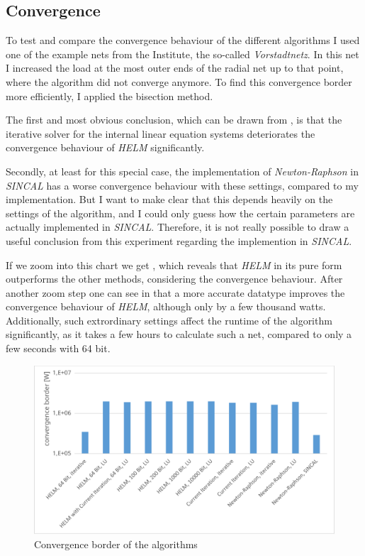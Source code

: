 \subsection{Convergence}

To test and compare the convergence behaviour of the different algorithms I used one of the example nets from the Institute, the so-called \emph{Vorstadtnetz}. In this net I increased the load at the most outer ends of the radial net up to that point, where the algorithm did not converge anymore. To find this convergence border more efficiently, I applied the bisection method.

The first and most obvious conclusion, which can be drawn from , is that the iterative solver for the internal linear equation systems deteriorates the convergence behaviour of \emph{HELM} significantly. 

Secondly, at least for this special case, the implementation of \emph{Newton-Raphson} in \emph{SINCAL} has a worse convergence behaviour with these settings, compared to my implementation. But I want to make clear that this depends heavily on the settings of the algorithm, and I could only guess how the certain parameters are actually implemented in \emph{SINCAL}. Therefore, it is not really possible to draw a useful conclusion from this experiment regarding the implemention in \emph{SINCAL}.

If we zoom into this chart we get , which reveals that \emph{HELM} in its pure form outperforms the other methods, considering the convergence behaviour. After another zoom step one can see in  that a more accurate datatype improves the convergence behaviour of \emph{HELM}, although only by a few thousand watts. Additionally, such extrordinary settings affect the runtime of the algorithm significantly, as it takes a few hours to calculate such a net, compared to only a few seconds with 64 bit.

\begin{figure}
	\centering
	\includegraphics[scale=0.7]{figures/convergence_border_vorstadtnetz_1}
	\caption[Comparison, convergence]{Convergence border of the algorithms}
	\label{fig:comparison_convergence_border_1}
\end{figure}

